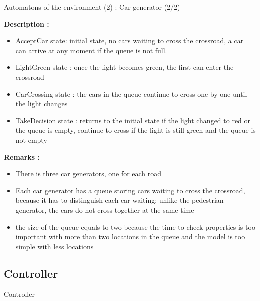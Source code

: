 \documentclass{bredelebeamer}
\begin{document}
\begin{frame}{Automatons of the environment (2) : Car generator (2/2)}



\textbf{Description : }


\begin{itemize}

\item AcceptCar state: initial state, no cars waiting to cross the crossroad, a car can arrive at any moment if the queue is not full.

\item LightGreen state : once the light becomes green, the first can enter the crossroad

\item CarCrossing state : the cars in the queue continue to cross one by one until the light changes

\item TakeDecision state : returns to the initial state if the light changed to red or the queue is empty, continue to cross if the light is still green and the queue is not empty

\end{itemize}


\textbf{Remarks : }


\begin{itemize}

\item There is three car generators, one for each road

\item Each car generator has a queue storing cars waiting to cross the crossroad, because it has to distinguish each car waiting; unlike the pedestrian generator, the cars do not cross together at the same time

\item the size of the queue equals to two because the time to check properties is too important with more than two locations in the queue and the model is too simple with less locations

\end{itemize}


\end{frame}

\subsection{Controller}
\begin{frame}{Controller}

\end{frame}
\end{document}
